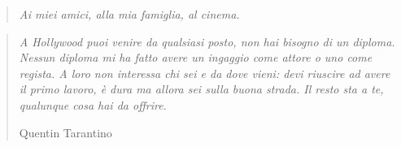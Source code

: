 \documentclass[12pt]{article} %
\renewcommand{\baselinestretch}{1.5} %
\begin{document}
\renewcommand{\baselinestretch}{1.5}
\begin{quote}
    \begin{flushright}
    \textit{Ai miei amici, alla mia famiglia, al cinema.}
    \end{flushright}
\end{quote}
\break

\begin{quote}
    \textit{A Hollywood puoi venire da qualsiasi posto, non hai bisogno di un diploma. Nessun diploma mi ha fatto avere un ingaggio come attore o uno come regista. A loro non interessa chi sei e da dove vieni: devi riuscire ad avere il primo lavoro, è dura ma allora sei sulla buona strada. Il resto sta a te, qualunque cosa hai da offrire.}
    \begin{flushright} Quentin Tarantino
    \end{flushright}
\end{quote}
\break

\renewcommand{\contentsname}{Indice}
\tableofcontents
\break
\end{document}
